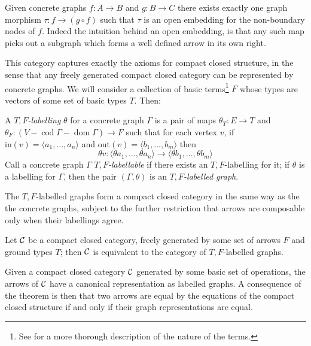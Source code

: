 \documentclass[runningheads]{llncs}
\newcommand{\dom}{\operatorname{dom}}
\newcommand{\cod}{\operatorname{cod}}
\newcommand{\catC}{\ensuremath{{\cal C}}\xspace}
\begin{document}
\begin{remark}
  Given concrete graphs $f : A\to B$ and $g:B\to C$ there exists
  exactly one graph morphism  $\tau:  f \to (g\circ f)$ such that
  $\tau$ is an open embedding for the non-boundary nodes
  of $f$.   Indeed the intuition behind an open embedding, is that any
  such map picks out a subgraph which forms a well defined arrow in
  its own right.
\end{remark}

This category captures exactly the axioms for compact closed
structure, in the sense that any freely generated compact closed
category can be represented by concrete graphs.  We will consider
a collection of basic terms\footnote{See \cite{Duncan:thesis:2006} for
  a more thorough description of the nature of the terms.} $F$
whose types are vectors of some set of basic types $T$.  Then:

\begin{definition}
  A \emph{$T,F$-labelling} $\theta$ for a concrete graph $\Gamma$ is a pair of
  maps  $\theta_T : E \to T$ and $\theta_F : (V - \cod\Gamma -
  \dom\Gamma) \to F$  such that for each vertex  $v$, if
  $\text{in}(v) = \langle a_1, \ldots, a_n\rangle$ and $\text{out}(v)
  = \langle b_1, \ldots, b_m\rangle$ then 
  \[
  \theta v : \langle \theta a_1, \ldots, \theta a_n \rangle
  \to 
  \langle \theta b_1, \ldots, \theta b_m \rangle
  \]
  Call a concrete graph $\Gamma$ \emph{$T,F$-labellable} if there exists an 
  $T,F$-labelling for it; if $\theta$ is a labelling for $\Gamma$, then
 the pair $(\Gamma,\theta)$ is an \emph{$T,F$-labelled graph}.
\end{definition}

The $T,F$-labelled graphs form a compact closed category in the same
way as the the concrete graphs, subject to the further restriction
that arrows are composable only when their labellings agree.  

\begin{theorem}
  Let \catC be a compact closed category, freely generated by some set
  of arrows $F$ and ground types $T$;  then \catC is equivalent to the
  category  of $T,F$-labelled graphs.
\end{theorem}

Given a compact closed  category  \catC generated by some basic set of
operations,  the arrows of \catC have a canonical representation as
labelled graphs.  A consequence of the theorem is then that two arrows
are equal by the equations of the compact closed  structure if and
only if their graph representations are equal.
\end{document}
